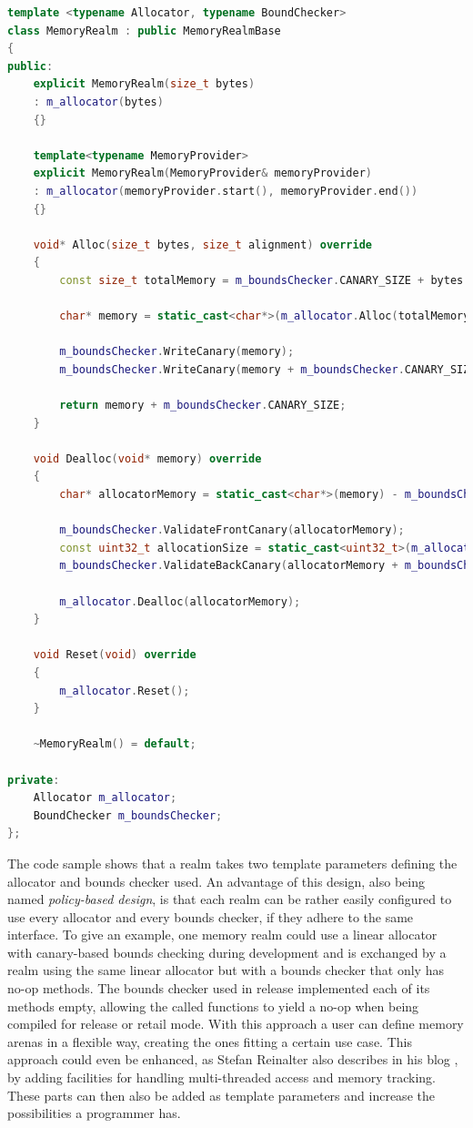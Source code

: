 \begin{lstlisting}[caption={Implementation of the memory realm in C++. Some implementation deatils were omitted.)}, label={lst:cpp_mem_realm}, language={C++}]
template <typename Allocator, typename BoundChecker>
class MemoryRealm : public MemoryRealmBase
{
public:
	explicit MemoryRealm(size_t bytes)
	: m_allocator(bytes)
	{}
	
	template<typename MemoryProvider>
	explicit MemoryRealm(MemoryProvider& memoryProvider)
	: m_allocator(memoryProvider.start(), memoryProvider.end())
	{}
	
	void* Alloc(size_t bytes, size_t alignment) override
	{
		const size_t totalMemory = m_boundsChecker.CANARY_SIZE + bytes + m_boundsChecker.CANARY_SIZE;
		
		char* memory = static_cast<char*>(m_allocator.Alloc(totalMemory, alignment, m_boundsChecker.CANARY_SIZE));
		
		m_boundsChecker.WriteCanary(memory);
		m_boundsChecker.WriteCanary(memory + m_boundsChecker.CANARY_SIZE + bytes);
		
		return memory + m_boundsChecker.CANARY_SIZE;
	}
	
	void Dealloc(void* memory) override
	{
		char* allocatorMemory = static_cast<char*>(memory) - m_boundsChecker.CANARY_SIZE;
		
		m_boundsChecker.ValidateFrontCanary(allocatorMemory);
		const uint32_t allocationSize = static_cast<uint32_t>(m_allocator.GetAllocationSize(allocatorMemory));
		m_boundsChecker.ValidateBackCanary(allocatorMemory + m_boundsChecker.CANARY_SIZE + allocationSize);
		
		m_allocator.Dealloc(allocatorMemory);
	}
	
	void Reset(void) override
	{
		m_allocator.Reset();
	}
	
	~MemoryRealm() = default;

private:
	Allocator m_allocator;
	BoundChecker m_boundsChecker;
};
\end{lstlisting}

\noindent
The code sample shows that a realm takes two template parameters defining the allocator and bounds checker used. An advantage of this design, also being named \textit{policy-based design}, is that each realm can be rather easily configured to use every allocator and every bounds checker, if they adhere to the same interface. To give an example, one memory realm could use a linear allocator with canary-based bounds checking during development and is exchanged by a realm using the same linear allocator but with a bounds checker that only has no-op methods. The bounds checker used in release implemented each of its methods empty, allowing the called functions to yield a no-op when being compiled for release or retail mode. With this approach a user can define memory arenas in a flexible way, creating the ones fitting a certain use case. This approach could even be enhanced, as Stefan Reinalter also describes in his blog \cite{MOL_MS_5}, by adding facilities for handling multi-threaded access and memory tracking. These parts can then also be added as template parameters and increase the possibilities a programmer has.

